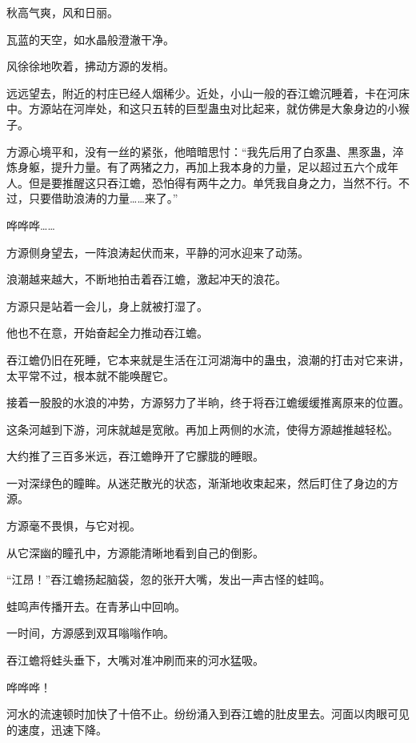 
\begin{this_body}



秋高气爽，风和日丽。

瓦蓝的天空，如水晶般澄澈干净。

风徐徐地吹着，拂动方源的发梢。

远远望去，附近的村庄已经人烟稀少。近处，小山一般的吞江蟾沉睡着，卡在河床中。方源站在河岸处，和这只五转的巨型蛊虫对比起来，就仿佛是大象身边的小猴子。

方源心境平和，没有一丝的紧张，他暗暗思忖：“我先后用了白豕蛊、黒豕蛊，淬炼身躯，提升力量。有了两猪之力，再加上我本身的力量，足以超过五六个成年人。但是要推醒这只吞江蟾，恐怕得有两牛之力。单凭我自身之力，当然不行。不过，只要借助浪涛的力量……来了。”

哗哗哗……

方源侧身望去，一阵浪涛起伏而来，平静的河水迎来了动荡。

浪潮越来越大，不断地拍击着吞江蟾，激起冲天的浪花。

方源只是站着一会儿，身上就被打湿了。

他也不在意，开始奋起全力推动吞江蟾。

吞江蟾仍旧在死睡，它本来就是生活在江河湖海中的蛊虫，浪潮的打击对它来讲，太平常不过，根本就不能唤醒它。

接着一股股的水浪的冲势，方源努力了半晌，终于将吞江蟾缓缓推离原来的位置。

这条河越到下游，河床就越是宽敞。再加上两侧的水流，使得方源越推越轻松。

大约推了三百多米远，吞江蟾睁开了它朦胧的睡眼。

一对深绿色的瞳眸。从迷茫散光的状态，渐渐地收束起来，然后盯住了身边的方源。

方源毫不畏惧，与它对视。

从它深幽的瞳孔中，方源能清晰地看到自己的倒影。

“江昂！”吞江蟾扬起脑袋，忽的张开大嘴，发出一声古怪的蛙鸣。

蛙鸣声传播开去。在青茅山中回响。

一时间，方源感到双耳嗡嗡作响。

吞江蟾将蛙头垂下，大嘴对准冲刷而来的河水猛吸。

哗哗哗！

河水的流速顿时加快了十倍不止。纷纷涌入到吞江蟾的肚皮里去。河面以肉眼可见的速度，迅速下降。


\end{this_body}
